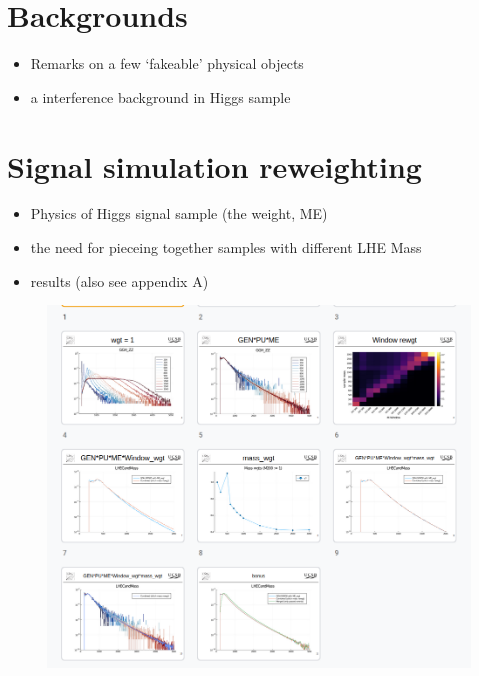 \section{Backgrounds}
\begin{itemize}
    \item Remarks on a few `fakeable' physical objects
    \item a interference background in Higgs sample
\end{itemize}
\newpage\phantom{blabla}


\section{Signal simulation reweighting}
\begin{itemize}
    \item Physics of Higgs signal sample (the weight, ME)
    \item the need for pieceing together samples with different LHE Mass
    \item results (also see appendix A)
\end{itemize}
\begin{figure}[htb]
\begin{center}
\includegraphics[width=.90\linewidth]{fig/signal_rewgt_placeholder.png}
\end{center}
\label{fig:sig_rewgt}
\end{figure}
\newpage\phantom{blabla}


